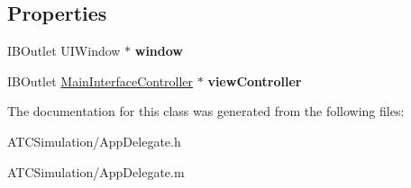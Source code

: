 \subsection*{\-Properties}
\begin{DoxyCompactItemize}
\item 
\hypertarget{interface_app_delegate_a7ac593baa2b0731539255124a233da91}{
\-I\-B\-Outlet \-U\-I\-Window $\ast$ {\bfseries window}}
\label{interface_app_delegate_a7ac593baa2b0731539255124a233da91}

\item 
\hypertarget{interface_app_delegate_abbe27a1e4c9612e4d518d860f62d5de9}{
\-I\-B\-Outlet \hyperlink{interface_main_interface_controller}{\-Main\-Interface\-Controller} $\ast$ {\bfseries view\-Controller}}
\label{interface_app_delegate_abbe27a1e4c9612e4d518d860f62d5de9}

\end{DoxyCompactItemize}


\-The documentation for this class was generated from the following files\-:\begin{DoxyCompactItemize}
\item 
\-A\-T\-C\-Simulation/\-App\-Delegate.\-h\item 
\-A\-T\-C\-Simulation/\-App\-Delegate.\-m\end{DoxyCompactItemize}
